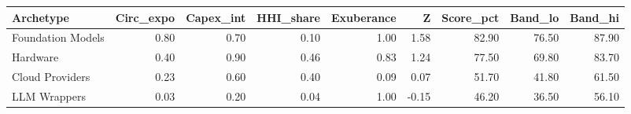 \begin{tabular}{lrrrrrrrr}
\toprule
Archetype & Circ_expo & Capex_int & HHI_share & Exuberance & Z & Score_pct & Band_lo & Band_hi \\
\midrule
Foundation Models & 0.80 & 0.70 & 0.10 & 1.00 & 1.58 & 82.90 & 76.50 & 87.90 \\
Hardware & 0.40 & 0.90 & 0.46 & 0.83 & 1.24 & 77.50 & 69.80 & 83.70 \\
Cloud Providers & 0.23 & 0.60 & 0.40 & 0.09 & 0.07 & 51.70 & 41.80 & 61.50 \\
LLM Wrappers & 0.03 & 0.20 & 0.04 & 1.00 & -0.15 & 46.20 & 36.50 & 56.10 \\
\bottomrule
\end{tabular}
